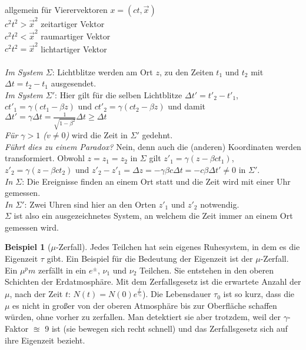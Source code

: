 \documentclass[oneside]{book}
\theoremstyle{definition}
\newtheorem*{beispiel*}{Beispiel}
\begin{document}
allgemein für Vierervektoren $x = (ct, \vec{x})$\\
$c^2 t^2 > \vec{x}^2$ zeitartiger Vektor\\
$c^2 t^2 < \vec{x}^2$ raumartiger Vektor\\
$c^2 t^2 = \vec{x}^2$ lichtartiger Vektor\\
~\\
\textit{Im System $\Sigma$}: Lichtblitze werden am Ort $z$, zu den Zeiten $t_1$ und $t_2$ mit $\Delta t = t_2 - t_1$ ausgesendet.\\
\textit{Im System $\Sigma'$}: Hier gilt für die selben Lichtblitze $\Delta t' = t'_2 - t'_1$, $c t'_1 = \gamma (c t_1 - \beta z)$ und $c t'_2 = \gamma (ct_2 - \beta z)$ und damit $\Delta t' = \gamma \Delta t = \frac{1}{\sqrt{1 - \beta^2}} \Delta t \geq \Delta t$\\
\textit{Für $\gamma > 1$ ($v \neq 0$)} wird die Zeit in $\Sigma'$ gedehnt.\\
\textit{Führt dies zu einem Paradox?} Nein, denn auch die (anderen) Koordinaten werden transformiert. Obwohl $z = z_1 = z_2$ in $\Sigma$ gilt $z'_1 = \gamma (z - \beta c t_1)$, $z'_2 = \gamma (z - \beta c t_2)$ und $z'_2 - z'_1 = \Delta z = - \gamma \beta c \Delta t = - c \beta \Delta t' \neq 0$ in $\Sigma'$.\\
\textit{In $\Sigma$}: Die Ereignisse finden an einem Ort statt und die Zeit wird mit einer Uhr gemessen.\\
\textit{In $\Sigma'$}: Zwei Uhren sind hier an den Orten $z'_1$ und $z'_2$ notwendig.\\
$\Sigma$ ist also ein ausgezeichnetes System, an welchem die Zeit immer an einem Ort gemessen wird.

\begin{beispiel*}[$\mu$-Zerfall]
	Jedes Teilchen hat sein eigenes Ruhesystem, in dem es die Eigenzeit $\tau$ gibt. Ein Beispiel für die Bedeutung der Eigenzeit ist der $\mu$-Zerfall. Ein $\mu^pm$ zerfällt in ein $e^\pm$, $\nu_1$ und $\nu_2$ Teilchen. Sie entstehen in den oberen Schichten der Erdatmosphäre. Mit dem Zerfallsgesetz ist die erwartete Anzahl der $\mu$, nach der Zeit $t$: $N(t) = N(0) e^{\frac{t}{\tau_0}}$). Die Lebensdauer $\tau_0$ ist so kurz, dass die $\mu$ es nicht in großer von der oberen Atmosphäre bis zur Oberfläche schaffen würden, ohne vorher zu zerfallen. Man detektiert sie aber trotzdem, weil der $\gamma$-Faktor $\approxeq$ 9 ist (sie bewegen sich recht schnell) und das Zerfallsgesetz sich auf ihre Eigenzeit bezieht. 
\end{beispiel*}
\end{document}
